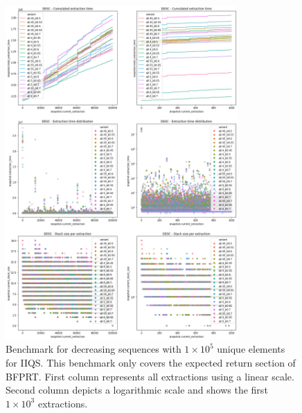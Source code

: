 \begin{figure}[p]
    \centering
    \includegraphics[width=0.79\textwidth]{./fragments/04_experimental_execution/images/04_alphabeta_detail_decreasing_inner.png}
    \caption{Benchmark for decreasing sequences with $1\times10^5$ unique elements for IIQS. This benchmark only covers the expected return section of BFPRT. First column represents all extractions using a linear scale. Second column depicts a logarithmic scale and shows the first $1\times10^3$ extractions. }
    \label{FIG:05_ALPHABETA_BENCHMARK_DESC_INNER}
\end{figure}

